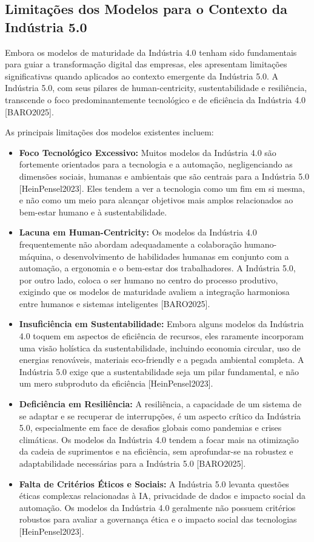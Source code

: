 \subsection{Limitações dos Modelos para o Contexto da Indústria 5.0}

Embora os modelos de maturidade da Indústria 4.0 tenham sido fundamentais para guiar a transformação digital das empresas, eles apresentam limitações significativas quando aplicados ao contexto emergente da Indústria 5.0. A Indústria 5.0, com seus pilares de human-centricity, sustentabilidade e resiliência, transcende o foco predominantemente tecnológico e de eficiência da Indústria 4.0 [BARO2025].

As principais limitações dos modelos existentes incluem:
\begin{itemize}
    \item \textbf{Foco Tecnológico Excessivo:} Muitos modelos da Indústria 4.0 são fortemente orientados para a tecnologia e a automação, negligenciando as dimensões sociais, humanas e ambientais que são centrais para a Indústria 5.0 [HeinPensel2023]. Eles tendem a ver a tecnologia como um fim em si mesma, e não como um meio para alcançar objetivos mais amplos relacionados ao bem-estar humano e à sustentabilidade.
    \item \textbf{Lacuna em Human-Centricity:} Os modelos da Indústria 4.0 frequentemente não abordam adequadamente a colaboração humano-máquina, o desenvolvimento de habilidades humanas em conjunto com a automação, a ergonomia e o bem-estar dos trabalhadores. A Indústria 5.0, por outro lado, coloca o ser humano no centro do processo produtivo, exigindo que os modelos de maturidade avaliem a integração harmoniosa entre humanos e sistemas inteligentes [BARO2025].
    \item \textbf{Insuficiência em Sustentabilidade:} Embora alguns modelos da Indústria 4.0 toquem em aspectos de eficiência de recursos, eles raramente incorporam uma visão holística da sustentabilidade, incluindo economia circular, uso de energias renováveis, materiais eco-friendly e a pegada ambiental completa. A Indústria 5.0 exige que a sustentabilidade seja um pilar fundamental, e não um mero subproduto da eficiência [HeinPensel2023].
    \item \textbf{Deficiência em Resiliência:} A resiliência, a capacidade de um sistema de se adaptar e se recuperar de interrupções, é um aspecto crítico da Indústria 5.0, especialmente em face de desafios globais como pandemias e crises climáticas. Os modelos da Indústria 4.0 tendem a focar mais na otimização da cadeia de suprimentos e na eficiência, sem aprofundar-se na robustez e adaptabilidade necessárias para a Indústria 5.0 [BARO2025].
    \item \textbf{Falta de Critérios Éticos e Sociais:} A Indústria 5.0 levanta questões éticas complexas relacionadas à IA, privacidade de dados e impacto social da automação. Os modelos da Indústria 4.0 geralmente não possuem critérios robustos para avaliar a governança ética e o impacto social das tecnologias [HeinPensel2023].
\end{itemize}

